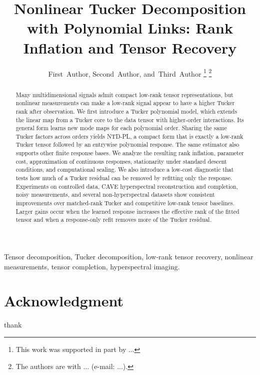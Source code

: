 \documentclass[journal]{IEEEtran}
\title{Nonlinear Tucker Decomposition with Polynomial Links: Rank Inflation and Tensor Recovery}
\author{First~Author,
        Second~Author,
        and~Third~Author%
\thanks{This work was supported in part by ...}
\thanks{The authors are with ... (e-mail: ...).}
}
\begin{document}
\maketitle

\begin{abstract}
Many multidimensional signals admit compact low-rank tensor representations,
but nonlinear measurements can make a low-rank signal appear to have a higher
Tucker rank after observation. We first introduce a Tucker polynomial model,
which extends the linear map from a Tucker core to the data tensor with
higher-order interactions. Its general form learns new mode maps for each
polynomial order. Sharing the same Tucker factors across orders yields NTD-PL,
a compact form that is exactly a low-rank Tucker tensor followed by an
entrywise polynomial response. The same estimator also supports other finite
response bases. We analyze the resulting rank inflation, parameter cost,
approximation of continuous responses, stationarity under standard descent
conditions, and computational scaling. We also introduce a low-cost diagnostic that tests
how much of a Tucker residual can be removed by refitting only the response.
Experiments on controlled data, CAVE hyperspectral reconstruction and
completion, noisy measurements, and several non-hyperspectral datasets show
consistent improvements over matched-rank Tucker and competitive low-rank
tensor baselines. Larger gains occur when the learned response increases the
effective rank of the fitted tensor and when a response-only refit removes more
of the Tucker residual.
\end{abstract}

\begin{IEEEkeywords}
Tensor decomposition, Tucker decomposition, low-rank tensor recovery,
nonlinear measurements, tensor completion, hyperspectral imaging.
\end{IEEEkeywords}









\section*{Acknowledgment}
thank



\end{document}
